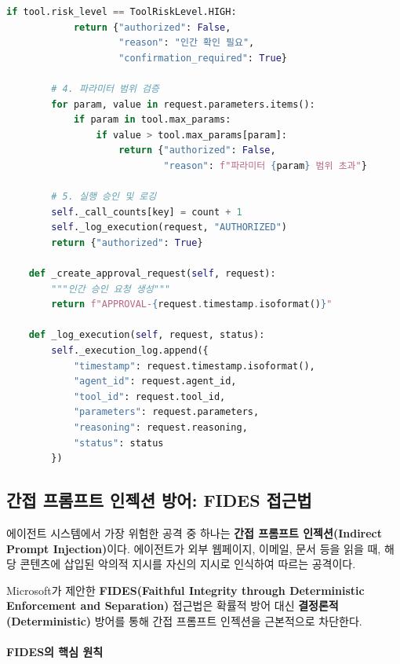 \begin{lstlisting}[language=Python, caption={에이전트 도구 권한 제어 시스템}, label={lst:agent_tool_permission}]
        if tool.risk_level == ToolRiskLevel.HIGH:
            return {"authorized": False,
                    "reason": "인간 확인 필요",
                    "confirmation_required": True}

        # 4. 파라미터 범위 검증
        for param, value in request.parameters.items():
            if param in tool.max_params:
                if value > tool.max_params[param]:
                    return {"authorized": False,
                            "reason": f"파라미터 {param} 범위 초과"}

        # 5. 실행 승인 및 로깅
        self._call_counts[key] = count + 1
        self._log_execution(request, "AUTHORIZED")
        return {"authorized": True}

    def _create_approval_request(self, request):
        """인간 승인 요청 생성"""
        return f"APPROVAL-{request.timestamp.isoformat()}"

    def _log_execution(self, request, status):
        self._execution_log.append({
            "timestamp": request.timestamp.isoformat(),
            "agent_id": request.agent_id,
            "tool_id": request.tool_id,
            "parameters": request.parameters,
            "reasoning": request.reasoning,
            "status": status
        })
\end{lstlisting}


\subsection{간접 프롬프트 인젝션 방어: FIDES 접근법}
\label{sec:13.6.3}

에이전트 시스템에서 가장 위험한 공격 중 하나는 \textbf{간접 프롬프트 인젝션(Indirect Prompt Injection)}이다. 에이전트가 외부 웹페이지, 이메일, 문서 등을 읽을 때, 해당 콘텐츠에 삽입된 악의적 지시를 자신의 지시로 인식하여 따르는 공격이다.

Microsoft가 제안한 \textbf{FIDES(Faithful Integrity through Deterministic Enforcement and Separation)} 접근법은 확률적 방어 대신 \textbf{결정론적(Deterministic)} 방어를 통해 간접 프롬프트 인젝션을 근본적으로 차단한다.

\paragraph{FIDES의 핵심 원칙}

